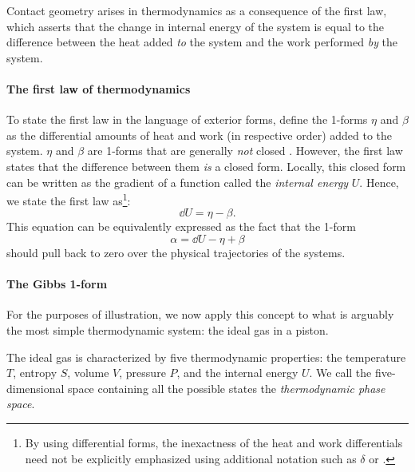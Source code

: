 Contact geometry arises in thermodynamics as a consequence of the first law, which asserts that the change in internal energy of the system is equal to the difference between the heat added \emph{to} the system and the work performed \emph{by} the system. 

\paragraph{The first law of thermodynamics} To state the first law in the language of exterior forms, define the 1-forms \(\eta\) and \(\beta\) as the differential amounts of heat and work (in respective order) added to the system. \(\eta\) and \(\beta\) are 1-forms that are generally \emph{not} closed \cite{Bamberg1988,Frankel2012}. However, the first law states that the difference between them \emph{is} a closed form. Locally, this closed form  can be written as the gradient of a function called the \emph{internal energy} \(U\). Hence, we state the first law as\footnote{By using differential forms, the inexactness of the heat and work differentials need not be explicitly emphasized using additional notation such as \(\delta\) or \dj.}:
\begin{equation}
    \dd{U} = \eta - \beta.
    \label{eq:thermo_first_law}
\end{equation}
This equation can be equivalently expressed as the fact that the 1-form
\begin{equation}
    \alpha = \dd{U} - \eta + \beta
    \label{eq:first_law_contact}
\end{equation}
should pull back to zero over the physical trajectories of the systems.

\paragraph{The Gibbs 1-form} For the purposes of illustration, we now apply this concept to what is arguably the most simple thermodynamic system: the ideal gas in a piston. 

The ideal gas is characterized by five thermodynamic properties: the temperature \(T\), entropy \(S\), volume \(V\), pressure \(P\), and the internal energy \(U\). We call the five-dimensional space containing all the possible states the \emph{thermodynamic phase space}.

